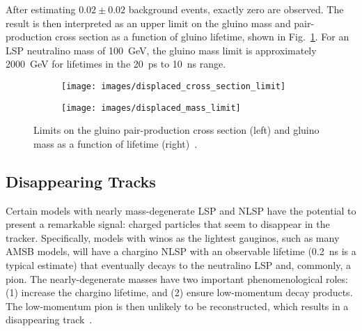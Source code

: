 \documentclass[12pt]{article}
\begin{document}
        After estimating $\num{0.02} \pm \num{0.02}$ background events, exactly zero are observed. The result is then interpreted as an upper limit on the gluino mass and pair-production cross section as a function of gluino lifetime, shown in Fig.~\ref{displaced_limit}. For an LSP neutralino mass of \SI{100}{\giga\electronvolt}, the gluino mass limit is approximately \SI{2000}{\giga\electronvolt} for lifetimes in the \SI{20}{\pico\s} to \SI{10}{\nano\s} range.

        \noindent \begin{figure}[htbp] \begin{center}
        \begin{subfigure}[htbp]{0.45\textwidth} \begin{center}
        \texttt{[image: images/displaced\_cross\_section\_limit]}
        \end{center} \end{subfigure}
        \begin{subfigure}[htbp]{0.45\textwidth} \begin{center}
        \texttt{[image: images/displaced\_mass\_limit]}
        \end{center} \end{subfigure}
            \caption{Limits on the gluino pair-production cross section (left) and gluino mass as a function of lifetime (right)~\cite{atlas_displaced}.}
        \label{displaced_limit}
        \end{center} \end{figure}

    \subsection{Disappearing Tracks}
        Certain models with nearly mass-degenerate LSP and NLSP have the potential to present a remarkable signal: charged particles that seem to disappear in the tracker. Specifically, models with winos as the lightest gauginos, such as many AMSB models, will have a chargino NLSP with an observable lifetime (\SI{0.2}{\nano\s} is a typical estimate) that eventually decays to the neutralino LSP and, commonly, a pion. The nearly-degenerate masses have two important phenomenological roles: (1) increase the chargino lifetime, and (2) ensure low-momentum decay products. The low-momentum pion is then unlikely to be reconstructed, which results in a disappearing track~\cite{atlas_disappearing}.
\end{document}
